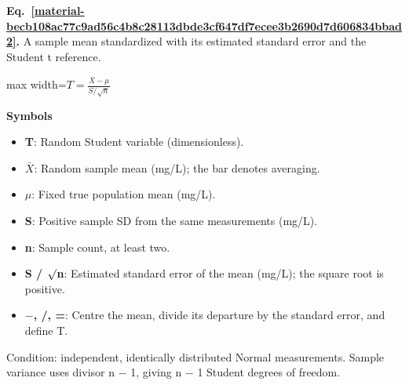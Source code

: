 \documentclass[11pt,a4paper]{article}
\begin{document}
\par\medskip
\begin{samepage}
\label{material-becb108ac77c9ad56c4b8c28113dbde3cf647df7ecee3b2690d7d606834bbad2}
\noindent\textbf{Eq.~\ref*{material-becb108ac77c9ad56c4b8c28113dbde3cf647df7ecee3b2690d7d606834bbad2}.} A sample mean standardized with its estimated standard error and the Student t reference.\par\nopagebreak
\begin{center}\begin{adjustbox}{max width=\linewidth}$\displaystyle T=\frac{\bar X-\mu}{S/\sqrt n}$\end{adjustbox}\end{center}

\par\noindent\textbf{Symbols}

\begin{itemize}\setlength{\itemsep}{1pt}\setlength{\parsep}{0pt}
\item \textbf{T}: Random Student variable (dimensionless).
\item \textbf{\ensuremath{\bar{X}}}: Random sample mean (mg/L); the bar denotes averaging.
\item \textbf{\ensuremath{\mu}}: Fixed true population mean (mg/L).
\item \textbf{S}: Positive sample SD from the same measurements (mg/L).
\item \textbf{n}: Sample count, at least two.
\item \textbf{S / \ensuremath{\sqrt{\vphantom{x}}}n}: Estimated standard error of the mean (mg/L); the square root is positive.
\item \textbf{\ensuremath{-}, /, =}: Centre the mean, divide its departure by the standard error, and define T.
\end{itemize}

Condition: independent, identically distributed Normal measurements. Sample variance uses divisor n \ensuremath{-} 1, giving n \ensuremath{-} 1 Student degrees of freedom.

\end{samepage}
\medskip
\end{document}
